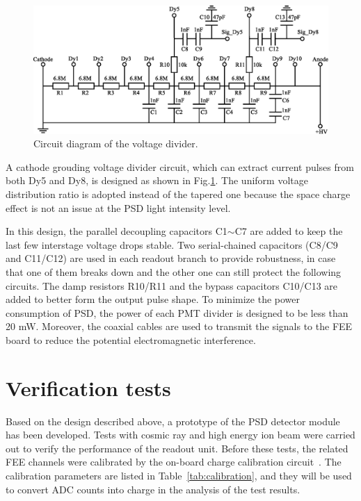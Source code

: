 \documentclass[preprint, times]{elsarticle}
\begin{document}
\begin{figure}
\centering
 \includegraphics[width=130mm]{divider}
\caption{Circuit diagram of the voltage divider.}
\label{fig:divider}
\end{figure}

A cathode grouding voltage divider circuit, which can extract current pulses from both Dy5 and Dy8, is designed as shown in Fig.\ref{fig:divider}.
The uniform voltage distribution ratio is adopted instead of the tapered one because the space charge effect is not an issue at the PSD light intensity level.

In this design, the parallel decoupling capacitors C1$\sim$C7 are added to keep the last few interstage voltage drops stable. Two serial-chained capacitors (C8/C9 and C11/C12) are used in each readout branch to provide robustness, in case that one of them breaks down and the other one can still protect the following circuits. 
The damp resistors R10/R11 and the bypass capacitors C10/C13 are added to better form the output pulse shape. 
To minimize the power consumption of PSD, the power of each PMT divider is designed to be less than 20 mW. 
Moreover, the coaxial cables are used to transmit the signals to the FEE board to reduce the potential electromagnetic interference.


\section{Verification tests}
\label{sec:result}
Based on the design described above, a prototype of the PSD detector module has been developed.
Tests with cosmic ray and high energy ion beam were carried out to verify the performance of the readout unit.
Before these tests, the related FEE channels were calibrated by the on-board charge calibration circuit~\cite{fee}.
The calibration parameters are listed in Table~\ref{tab:calibration}, and they will be used to convert ADC counts into charge in the analysis of the test results.
\end{document}

